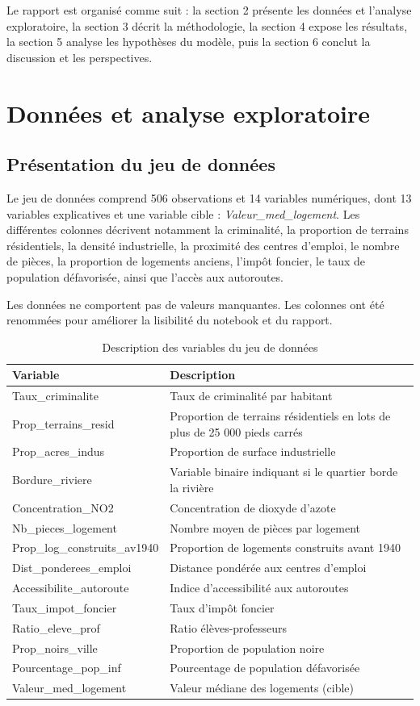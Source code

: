 \documentclass[a4paper,12pt]{article}
\begin{document}
Le rapport est organisé comme suit : la section 2 présente les données et l’analyse exploratoire, la section 3 décrit la méthodologie, la section 4 expose les résultats, la section 5 analyse les hypothèses du modèle, puis la section 6 conclut la discussion et les perspectives.

\section{Données et analyse exploratoire}

\subsection{Présentation du jeu de données}
Le jeu de données comprend 506 observations et 14 variables numériques, dont 13 variables explicatives et une variable cible : \textit{Valeur\_med\_logement}. Les différentes colonnes décrivent notamment la criminalité, la proportion de terrains résidentiels, la densité industrielle, la proximité des centres d’emploi, le nombre de pièces, la proportion de logements anciens, l’impôt foncier, le taux de population défavorisée, ainsi que l’accès aux autoroutes.

Les données ne comportent pas de valeurs manquantes. Les colonnes ont été renommées pour améliorer la lisibilité du notebook et du rapport.

\begin{table}[H]
\centering
\caption{Description des variables du jeu de données}
\begin{tabular}{lp{9cm}}
\toprule
Variable & Description \\
\midrule
Taux\_criminalite & Taux de criminalité par habitant \\
Prop\_terrains\_resid & Proportion de terrains résidentiels en lots de plus de 25 000 pieds carrés \\
Prop\_acres\_indus & Proportion de surface industrielle \\
Bordure\_riviere & Variable binaire indiquant si le quartier borde la rivière \\
Concentration\_NO2 & Concentration de dioxyde d’azote \\
Nb\_pieces\_logement & Nombre moyen de pièces par logement \\
Prop\_log\_construits\_av1940 & Proportion de logements construits avant 1940 \\
Dist\_ponderees\_emploi & Distance pondérée aux centres d’emploi \\
Accessibilite\_autoroute & Indice d’accessibilité aux autoroutes \\
Taux\_impot\_foncier & Taux d’impôt foncier \\
Ratio\_eleve\_prof & Ratio élèves-professeurs \\
Prop\_noirs\_ville & Proportion de population noire \\
Pourcentage\_pop\_inf & Pourcentage de population défavorisée \\
Valeur\_med\_logement & Valeur médiane des logements (cible) \\
\bottomrule
\end{tabular}
\end{table}
\end{document}
